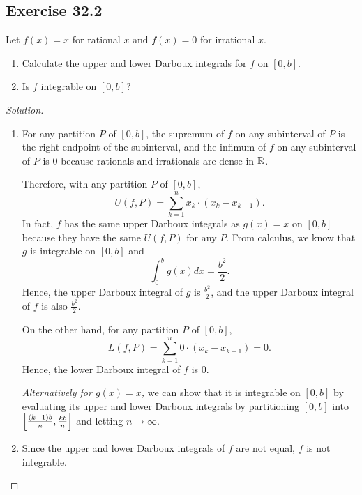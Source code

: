 \documentclass{article}
\begin{document}
\subsection*{Exercise 32.2}
Let $f(x)=x$ for rational $x$ and $f(x)=0$ for irrational $x$.
\begin{enumerate}[label=\tb{(\alph*)}]
    \item 
    Calculate the upper and lower Darboux integrals for $f$ on $[0,b]$.
    \item
    Is $f$ integrable on $[0,b]$?
\end{enumerate}
\begin{proof}[Solution]\indent
    \begin{enumerate}[label=\tb{(\alph*)}]
        \item For any partition $P$ of $[0,b]$, the supremum of $f$ on any subinterval
        of $P$ is the right endpoint of the subinterval, and the infimum of $f$ on any
        subinterval of $P$ is 0 because rationals and irrationals are dense in $\mathbb{R}$.

        Therefore, with any partition $P$ of $[0,b]$, 
        \[
          U(f,P) = \sum_{k=1}^{n}x_k\cdot (x_k-x_{k-1}).
        \]
        In fact, $f$ has the same upper Darboux integrals as $g(x)=x$ on $[0,b]$ because they have 
        the same $U(f,P)$ for any $P$. 
        From calculus, we know that $g$ is integrable on $[0,b]$ and 
        \[
            \int_0^b g(x)dx = \frac{b^2}{2}.
        \] 
        Hence, the upper Darboux integral of $g$ is $\frac{b^2}{2}$, and the upper Darboux 
        integral of $f$ is also $\frac{b^2}{2}$.

        On the other hand, for any partition $P$ of $[0,b]$,
        \[
            L(f,P) = \sum_{k=1}^{n}0\cdot (x_k-x_{k-1})=0.  
        \]
        Hence, the lower Darboux integral of $f$ is 0.

        \emph{Alternatively for $g(x)=x$,} we can show that it is integrable on $[0,b]$ 
        by evaluating its upper and lower Darboux integrals by partitioning $[0,b]$ into
         $\left[\frac{(k-1)b}{n}, \frac{kb}{n}\right]$ and letting $n\to\infty$.

        \item
        Since the upper and lower Darboux integrals of $f$ are not equal, $f$ is not integrable.
    \end{enumerate}    
\end{proof}


\newpage
\end{document}
